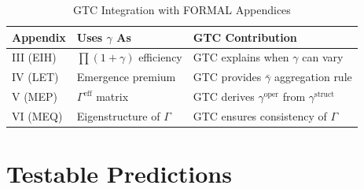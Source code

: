 \begin{table}[H]
\centering
\caption{GTC Integration with FORMAL Appendices}
\label{tab:gtc-formal-integration}
\renewcommand{\arraystretch}{1.4}
\begin{tabular}{@{}llp{6cm}@{}}
\toprule
\textbf{Appendix} & \textbf{Uses $\gamma$ As} & \textbf{GTC Contribution} \\
\midrule
III (EIH) & $\prod(1 + \gamma)$ efficiency & GTC explains when $\gamma$ can vary \\
IV (LET) & Emergence premium & GTC provides $\bar{\gamma}$ aggregation rule \\
V (MEP) & $\Gamma^{\text{eff}}$ matrix & GTC derives $\gamma^{\text{oper}}$ from $\gamma^{\text{struct}}$ \\
VI (MEQ) & Eigenstructure of $\Gamma$ & GTC ensures consistency of $\Gamma$ \\
\bottomrule
\end{tabular}
\end{table}

\section{Testable Predictions}
\label{sec:gtc-predictions}

